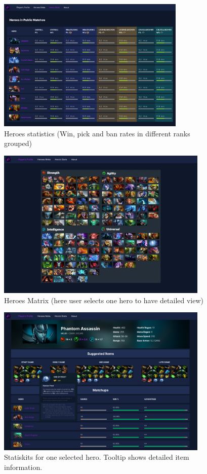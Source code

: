     \begin{figure}[ht]
        \centering
        \includegraphics[width=0.8\textwidth]{images/HeroStats}
        \caption{Heroes statistics (Win, pick and ban rates in different ranks grouped)}
    \end{figure}

    \begin{figure}[ht]
        \centering
        \includegraphics[width=0.9\textwidth]{images/HeroMatrix}
        \caption{Heroes Matrix (here user selects one hero to have detailed view)}
    \end{figure}

    \begin{figure}[ht]
        \centering
        \includegraphics[width=0.9\textwidth]{images/SelectedHero}
        \caption{Statiskits for one selected hero. Tooltip shows detailed item information.}
    \end{figure}

